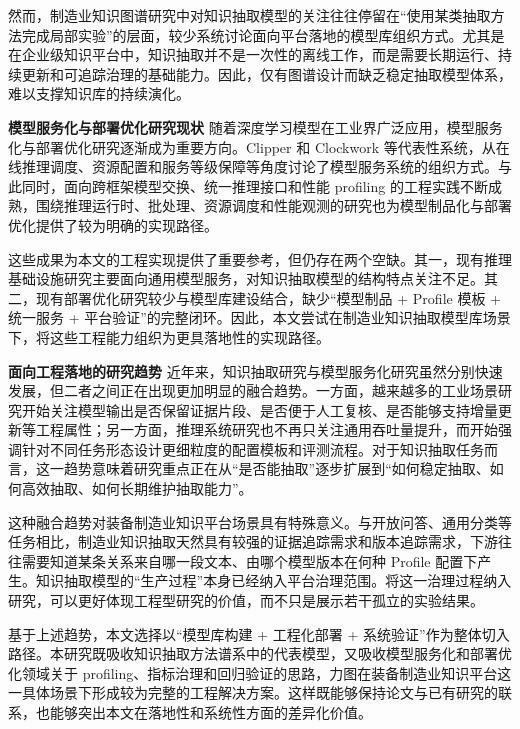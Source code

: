 然而，制造业知识图谱研究中对知识抽取模型的关注往往停留在“使用某类抽取方法完成局部实验”的层面，较少系统讨论面向平台落地的模型库组织方式。尤其是在企业级知识平台中，知识抽取并不是一次性的离线工作，而是需要长期运行、持续更新和可追踪治理的基础能力。因此，仅有图谱设计而缺乏稳定抽取模型体系，难以支撑知识库的持续演化。

\par\textbf{模型服务化与部署优化研究现状}
随着深度学习模型在工业界广泛应用，模型服务化与部署优化研究逐渐成为重要方向。Clipper 和 Clockwork 等代表性系统，从在线推理调度、资源配置和服务等级保障等角度讨论了模型服务系统的组织方式\cite{clipper2017,clockwork2020}。与此同时，面向跨框架模型交换、统一推理接口和性能 profiling 的工程实践不断成熟，围绕推理运行时、批处理、资源调度和性能观测的研究也为模型制品化与部署优化提供了较为明确的实现路径\cite{clipper2017,clockwork2020}。

这些成果为本文的工程实现提供了重要参考，但仍存在两个空缺。其一，现有推理基础设施研究主要面向通用模型服务，对知识抽取模型的结构特点关注不足。其二，现有部署优化研究较少与模型库建设结合，缺少“模型制品 + Profile 模板 + 统一服务 + 平台验证”的完整闭环。因此，本文尝试在制造业知识抽取模型库场景下，将这些工程能力组织为更具落地性的实现路径。

\par\textbf{面向工程落地的研究趋势}
近年来，知识抽取研究与模型服务化研究虽然分别快速发展，但二者之间正在出现更加明显的融合趋势。一方面，越来越多的工业场景研究开始关注模型输出是否保留证据片段、是否便于人工复核、是否能够支持增量更新等工程属性；另一方面，推理系统研究也不再只关注通用吞吐量提升，而开始强调针对不同任务形态设计更细粒度的配置模板和评测流程。对于知识抽取任务而言，这一趋势意味着研究重点正在从“是否能抽取”逐步扩展到“如何稳定抽取、如何高效抽取、如何长期维护抽取能力”。

这种融合趋势对装备制造业知识平台场景具有特殊意义。与开放问答、通用分类等任务相比，制造业知识抽取天然具有较强的证据追踪需求和版本追踪需求，下游往往需要知道某条关系来自哪一段文本、由哪个模型版本在何种 Profile 配置下产生。知识抽取模型的“生产过程”本身已经纳入平台治理范围。将这一治理过程纳入研究，可以更好体现工程型研究的价值，而不只是展示若干孤立的实验结果。

基于上述趋势，本文选择以“模型库构建 + 工程化部署 + 系统验证”作为整体切入路径。本研究既吸收知识抽取方法谱系中的代表模型，又吸收模型服务化和部署优化领域关于 profiling、指标治理和回归验证的思路，力图在装备制造业知识平台这一具体场景下形成较为完整的工程解决方案。这样既能够保持论文与已有研究的联系，也能够突出本文在落地性和系统性方面的差异化价值。

